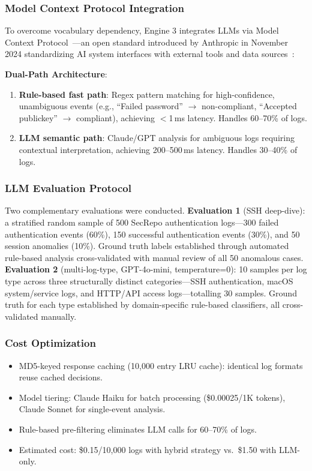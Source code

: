 \documentclass[futureinternet,article,submit,pdftex,moreauthors]{Definitions/mdpi}
\begin{document}
\subsubsection{Model Context Protocol Integration}

To overcome vocabulary dependency, Engine 3 integrates LLMs via Model Context
Protocol~\cite{mcp_anthropic,mcp_spec}---an open standard introduced by Anthropic in November
2024 standardizing AI system interfaces with external tools and data
sources~\cite{mcp_landscape}:

\textbf{Dual-Path Architecture}:
\begin{enumerate}
\item \textbf{Rule-based fast path}: Regex pattern matching for high-confidence, unambiguous
events (e.g., ``Failed password'' $\rightarrow$ non-compliant, ``Accepted publickey''
$\rightarrow$ compliant), achieving ${<}$1\,ms latency. Handles 60--70\% of logs.
\item \textbf{LLM semantic path}: Claude/GPT analysis for ambiguous logs requiring contextual
interpretation, achieving 200--500\,ms latency. Handles 30--40\% of logs.
\end{enumerate}

\subsubsection{LLM Evaluation Protocol}

Two complementary evaluations were conducted. \textbf{Evaluation 1} (SSH deep-dive): a
stratified random sample of 500 SecRepo authentication logs---300 failed authentication events
(60\%), 150 successful authentication events (30\%), and 50 session anomalies (10\%). Ground
truth labels established through automated rule-based analysis cross-validated with manual
review of all 50 anomalous cases. \textbf{Evaluation 2} (multi-log-type, GPT-4o-mini,
temperature=0): 10 samples per log type across three structurally distinct categories---SSH
authentication, macOS system/service logs, and HTTP/API access logs---totalling 30 samples.
Ground truth for each type established by domain-specific rule-based classifiers, all
cross-validated manually.

\subsubsection{Cost Optimization}

\begin{itemize}
\item MD5-keyed response caching (10{,}000 entry LRU cache): identical log formats reuse
cached decisions.
\item Model tiering: Claude Haiku for batch processing (\$0.00025/1K tokens), Claude Sonnet
for single-event analysis.
\item Rule-based pre-filtering eliminates LLM calls for 60--70\% of logs.
\item Estimated cost: \$0.15/10{,}000 logs with hybrid strategy vs.\ \$1.50 with LLM-only.
\end{itemize}
\end{document}

